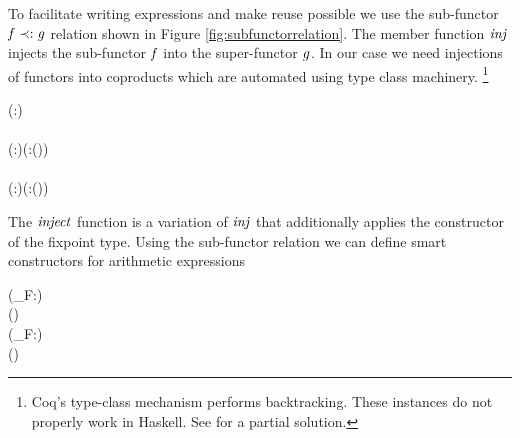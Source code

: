 To facilitate writing expressions and make reuse possible we use the
sub-functor \ensuremath{\Varid{f}\prec:\Varid{g}} relation shown in Figure
\ref{fig:subfunctorrelation}. The member function \ensuremath{\Varid{inj}} injects the
sub-functor \ensuremath{\Varid{f}} into the super-functor \ensuremath{\Varid{g}}. In our case we need
injections of functors into coproducts which are automated using type
class machinery. \footnote{Coq's type-class mechanism performs
backtracking. These instances do not properly work in Haskell. See
\cite{dtc} for a partial solution.}
\begin{hscode}\SaveRestoreHook
{}%
%
%
%
\>[3]{}\;(\prec:)\;\<[E]%
\\
\>[3]{}\<[5]%
\>[5]{}\mathrel{=}\<[E]%
\\
\>[3]{}\;(\prec:)\Rightarrow (\prec:(\oplus{}))\;\<[E]%
\\
\>[3]{}\<[5]%
\>[5]{}\mathrel{=}\<[E]%
\\
\>[3]{}\;(\prec:)\Rightarrow (\prec:(\oplus{}))\;\<[E]%
\\
\>[3]{}\<[5]%
\>[5]{}\mathrel{=}\<[E]%
\ColumnHook
\end{hscode}\resethooks
The \ensuremath{\Varid{inject}} function is a variation of \ensuremath{\Varid{inj}} that additionally
applies the constructor of the fixpoint type. Using the sub-functor
relation we can define smart constructors for arithmetic expressions
\begin{hscode}\SaveRestoreHook
{}%
%
%
\>[3]{}\mathbin{::}(_F\prec:)\Rightarrow {}\to {}\;\<[E]%
\\
\>[3]{}\;\mathrel{=}\;(\;){}\<[E]%
\\
\>[3]{}\mathbin{::}(_F\prec:)\Rightarrow {}\;\to {}\;\to {}\;\<[E]%
\\
\>[3]{}\;\;\mathrel{=}\;(\;\;){}\<[E]%
\ColumnHook
\end{hscode}\resethooks
